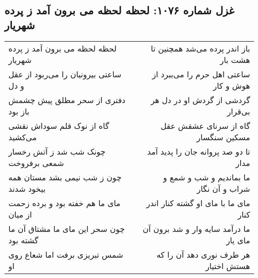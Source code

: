 \begin{center}
\section*{غزل شماره ۱۰۷۶: لحظه لحظه می برون آمد ز پرده شهریار}
\label{sec:1076}
\begin{longtable}{l p{0.5cm} r}
لحظه لحظه می برون آمد ز پرده شهریار
&&
باز اندر پرده می‌شد همچنین تا هشت بار
\\
ساعتی بیرونیان را می‌ربود از عقل و دل
&&
ساعتی اهل حرم را می‌ببرد از هوش و کار
\\
دفتری از سحر مطلق پیش چشمش باز بود
&&
گردشی از گردش او در دل هر بی‌قرار
\\
گاه از نوک قلم سوداش نقشی می‌کشید
&&
گاه از سرنای عشقش عقل مسکین سنگسار
\\
چونک شب شد ز آتش رخسار شمعی برفروخت
&&
تا دو صد پروانه جان را پدید آمد مدار
\\
چون ز شب نیمی بشد مستان همه بیخود شدند
&&
ما بماندیم و شب و شمع و شراب و آن نگار
\\
مای ما هم خفته بود و برده زحمت از میان
&&
مای ما با مای او گشته کنار اندر کنار
\\
چون سحر این مای ما مشتاق آن ما گشته بود
&&
ما درآمد سایه وار و شد برون آن مای یار
\\
شمس تبریزی برفت اما شعاع روی او
&&
هر طرف نوری دهد آن را که هستش اختیار
\\
\end{longtable}
\end{center}
